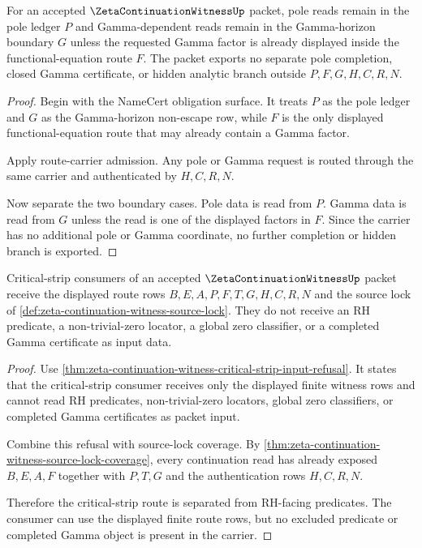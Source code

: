 \begin{theorem}
\label{thm:zeta-continuation-witness-pole-gamma-boundary}
For an accepted $\ZetaContinuationWitnessUp$ packet, pole reads remain in the pole ledger $P$ and Gamma-dependent reads remain in the Gamma-horizon boundary $G$ unless the requested Gamma factor is already displayed inside the functional-equation route $F$. The packet exports no separate pole completion, closed Gamma certificate, or hidden analytic branch outside $P,F,G,H,C,R,N$.
\end{theorem}
\begin{proof}
Begin with the NameCert obligation surface. It treats $P$ as the pole ledger and $G$ as the Gamma-horizon non-escape row, while $F$ is the only displayed functional-equation route that may already contain a Gamma factor.

Apply route-carrier admission. Any pole or Gamma request is routed through the same carrier and authenticated by $H,C,R,N$.

Now separate the two boundary cases. Pole data is read from $P$. Gamma data is read from $G$ unless the read is one of the displayed factors in $F$. Since the carrier has no additional pole or Gamma coordinate, no further completion or hidden branch is exported.
\end{proof}

\begin{theorem}
\label{thm:zeta-continuation-witness-critical-strip-route-separation}
Critical-strip consumers of an accepted $\ZetaContinuationWitnessUp$ packet receive the displayed route rows $B,E,A,P,F,T,G,H,C,R,N$ and the source lock of \autoref{def:zeta-continuation-witness-source-lock}. They do not receive an RH predicate, a non-trivial-zero locator, a global zero classifier, or a completed Gamma certificate as input data.
\end{theorem}
\begin{proof}
Use \autoref{thm:zeta-continuation-witness-critical-strip-input-refusal}. It states that the critical-strip consumer receives only the displayed finite witness rows and cannot read RH predicates, non-trivial-zero locators, global zero classifiers, or completed Gamma certificates as packet input.

Combine this refusal with source-lock coverage. By \autoref{thm:zeta-continuation-witness-source-lock-coverage}, every continuation read has already exposed $B,E,A,F$ together with $P,T,G$ and the authentication rows $H,C,R,N$.

Therefore the critical-strip route is separated from RH-facing predicates. The consumer can use the displayed finite route rows, but no excluded predicate or completed Gamma object is present in the carrier.
\end{proof}

